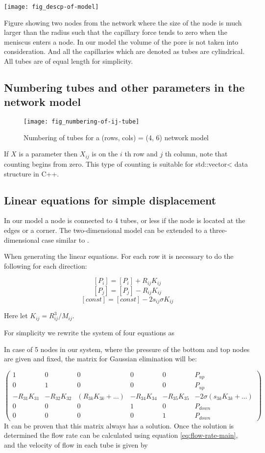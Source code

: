 \texttt{[image: fig\_descp-of-model]}

Figure showing two nodes from the network where the size of the node is much larger than the radius such that the capillary force tends to zero when the meniscus enters a node. In our model the volume of the pore is not taken into consideration. And all the capillaries which are denoted as tubes are cylindrical. All tubes are of equal length for simplicity.

\subsection{Numbering tubes and other parameters in the network model}
	\begin{figure}[H]
		\texttt{[image: fig\_numbering-of-ij-tube]}
		\caption{Numbering of tubes for a (rows, cols) = (4, 6) network model}
		\label{fig_numbering-of-ij-tube}
	\end{figure}
	
	If $X$ is a parameter then $X_{ij}$ is on the $i$ th row and $j$ th column, note that counting begins from zero. This type of counting is suitable for std::vector< data structure in C++. 
	
\subsection{Linear equations for simple displacement}
	In our model a node is connected to 4 tubes, or less if the node is located at the edges or a corner. The two-dimensional model can be extended to a three-dimensional case similar to \cite{sinha2017effective}.
	
	When generating the linear equations. For each row it is necessary to do the following for each direction:
	
	\[ [P_i] = [P_i] + R_{ij}K_{ij} \]
	\[ [P_j] = [P_j] - R_{ij}K_{ij} \]
	\[ [const] = [const] - 2s_{ij}\sigma K_{ij} \]
	
	Here let $K_{ij} = R^3_{ij}/{M}_{ij}$.

	For simplicity we rewrite the system of four equations as 
	
	In case of 5 nodes in our system, where the pressure of the bottom and top nodes are given and fixed, the matrix for Gaussian elimination will be:

	\[ 
	\begin{pmatrix}
		1 & 0 & 0 & 0 & 0 & P_{up}\\
		0 & 1 & 0 & 0 & 0 & P_{up}\\
		-R_{31}K_{31} & -R_{32}K_{32} & (R_{3k}K_{3k} + ...) & -R_{34}K_{34} & -R_{35}K_{35} & -2\sigma(s_{3k}K_{3k} + ...)\\
		0 & 0 & 0 & 1 & 0 & P_{down}\\
		0 & 0 & 0 & 0 & 1 & P_{down}
	\end{pmatrix}
	\]
	 It can be proven that this matrix always has a solution. Once the solution is determined the flow rate can be calculated using equation \ref{eq:flow-rate-main}, and the velocity of flow in each tube is given by
	 
